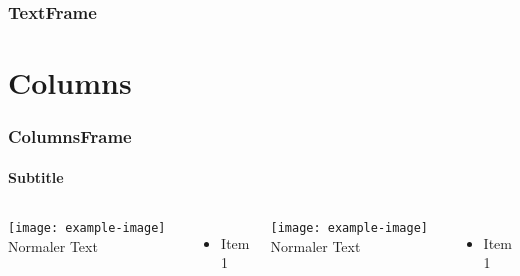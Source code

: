 \documentclass{beamer}
\begin{document}
\begin{frame}
  \frametitle{TextFrame}
  \small{}
  \blindtext
\end{frame}

\section{Columns}

\begin{frame}
  \frametitle{ColumnsFrame}
  \framesubtitle{Subtitle}
  \begin{columns}[onlytextwidth]
    \texttt{[image: example-image]}
    Normaler Text
    \begin{itemize}
      \item<1->{Item 1}
    \end{itemize}
    \texttt{[image: example-image]}
    Normaler Text
    \begin{itemize}
      \item<1->{Item 1}
    \end{itemize}
  \end{columns}
\end{frame}
\end{document}
